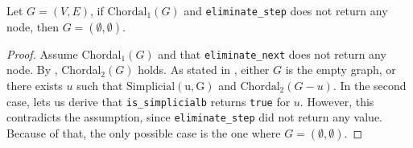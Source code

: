 \begin{theorem}\label{cor:inv-elim-2}
    Let $G = (V, E)$, if $\mathrm{Chordal}_1(G)$ and \texttt{eliminate\_step} does not return any node, then $G = (\emptyset, \emptyset)$.
\end{theorem}
\begin{proof}
    Assume Chordal$_1(G)$ and that \texttt{eliminate\_next} does not return any node. By , Chordal$_2(G)$ holds. As stated in , either $G$ is the empty graph, or there exists $u$ such that $\mathrm{Simplicial(u, G)}$ and $\mathrm{Chordal}_2(G - u)$. In the second case,  lets us derive that \texttt{is\_simplicialb} returns \texttt{true} for $u$. However, this contradicts the assumption, since \texttt{eliminate\_step} did not return any value. Because of that, the only possible case is the one where $G = (\emptyset, \emptyset)$.
\end{proof}